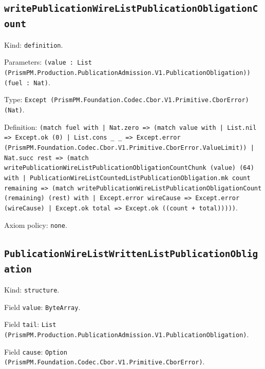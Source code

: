\documentclass[11pt]{article}
\begin{document}
\subsection*{\texttt{writePublicationWireListPublicationObligationCount}}
\noindent Kind: \texttt{definition}.\par
\noindent Parameters: \texttt{(value : List (PrismPM.Production.PublicationAdmission.V1.PublicationObligation)) (fuel : Nat)}.\par
\noindent Type: \texttt{Except (PrismPM.Foundation.Codec.Cbor.V1.Primitive.CborError) (Nat)}.\par
\noindent Definition: \texttt{(match fuel with | Nat.zero => (match value with | List.nil => Except.ok (0) | List.cons \_ \_ => Except.error (PrismPM.Foundation.Codec.Cbor.V1.Primitive.CborError.ValueLimit)) | Nat.succ rest => (match writePublicationWireListPublicationObligationCountChunk (value) (64) with | PublicationWireListCountedListPublicationObligation.mk count remaining => (match writePublicationWireListPublicationObligationCount (remaining) (rest) with | Except.error wireCause => Except.error (wireCause) | Except.ok total => Except.ok ((count + total)))))}.\par
\noindent Axiom policy: \texttt{none}.\par
\subsection*{\texttt{PublicationWireListWrittenListPublicationObligation}}
\noindent Kind: \texttt{structure}.\par
\noindent Field \texttt{value}: \texttt{ByteArray}.\par
\noindent Field \texttt{tail}: \texttt{List (PrismPM.Production.PublicationAdmission.V1.PublicationObligation)}.\par
\noindent Field \texttt{cause}: \texttt{Option (PrismPM.Foundation.Codec.Cbor.V1.Primitive.CborError)}.\par
\end{document}
